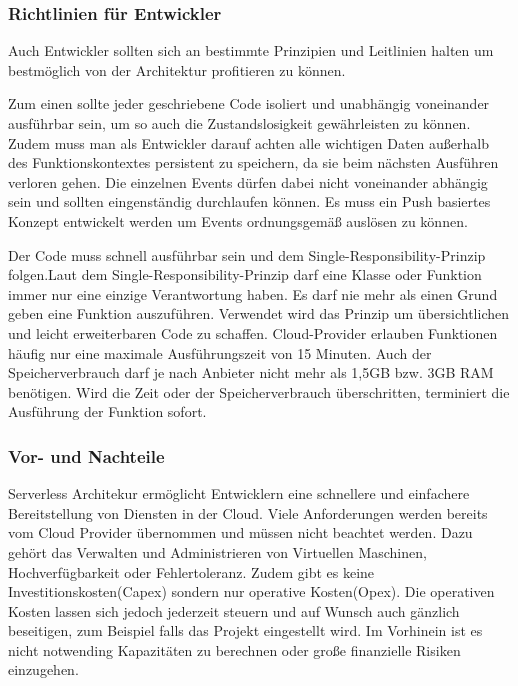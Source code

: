 \subsubsection{Richtlinien für Entwickler }

Auch Entwickler sollten sich an bestimmte Prinzipien und Leitlinien halten um bestmöglich von der Architektur profitieren zu können.

Zum einen sollte jeder geschriebene Code isoliert und unabhängig voneinander ausführbar sein, um so auch
die Zustandslosigkeit gewährleisten zu können.
Zudem muss man als Entwickler darauf achten alle wichtigen Daten außerhalb des Funktionskontextes persistent zu speichern, da sie beim nächsten Ausführen verloren gehen.
Die einzelnen Events dürfen dabei nicht voneinander abhängig sein und sollten eingenständig durchlaufen können.
Es muss ein Push basiertes Konzept entwickelt werden um Events ordnungsgemäß auslösen zu können.

Der Code muss schnell ausführbar sein und dem Single-Responsibility-Prinzip
folgen.Laut dem Single-Responsibility-Prinzip darf eine Klasse oder Funktion immer nur eine einzige Verantwortung haben.
Es darf nie mehr als einen Grund geben eine Funktion auszuführen. Verwendet wird das Prinzip um übersichtlichen und leicht erweiterbaren Code zu schaffen.
Cloud-Provider erlauben Funktionen häufig nur eine maximale Ausführungszeit von 15 Minuten. Auch der Speicherverbrauch darf je nach Anbieter nicht mehr
als 1,5GB bzw. 3GB RAM benötigen.
Wird die Zeit oder der Speicherverbrauch überschritten, terminiert die Ausführung der Funktion sofort.



\subsubsection{Vor- und Nachteile}
Serverless Architekur ermöglicht Entwicklern eine schnellere und einfachere Bereitstellung von Diensten in der Cloud.
Viele Anforderungen werden bereits vom Cloud Provider übernommen und müssen nicht beachtet werden.
Dazu gehört das Verwalten und Administrieren von Virtuellen Maschinen, Hochverfügbarkeit oder Fehlertoleranz.
Zudem gibt es keine Investitionskosten(Capex) sondern nur operative Kosten(Opex). Die operativen Kosten lassen sich jedoch
jederzeit steuern und auf Wunsch auch gänzlich beseitigen, zum Beispiel falls das Projekt eingestellt wird.
Im Vorhinein ist es nicht notwending Kapazitäten zu berechnen oder große finanzielle Risiken einzugehen.

